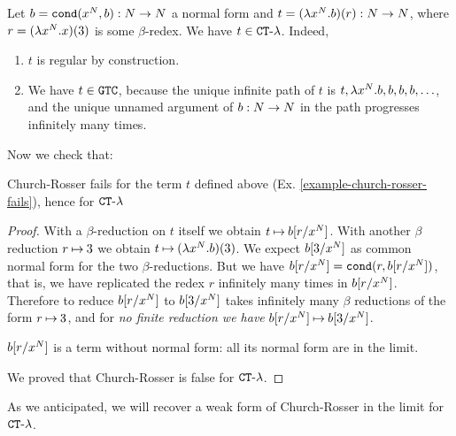 \begin{Eg}
\label{example-church-rosser-fails}
Let $b = {\tt cond}(x^{{N}},b):{N} \rightarrow {N}$ a normal form
and $t = (\lambda x^{{N}}.b)(r):{N} \rightarrow {N}$, 
where $r = (\lambda x^{{N}}.x)(3)$ is some $\beta$-redex. 
We have $t \in { {\tt CT}\mbox{-}\lambda}$. Indeed, 
\begin{enumerate}
\item
$t$ is regular by construction.
\item
We have $t \in {\tt GTC}$, because the unique infinite path of $t$ is 
$t, \lambda x^{{N}}.b, b, b, b, \ldots$, and the
unique unnamed argument of $b:{N} \rightarrow {N}$ in the path progresses infinitely many times.
\end{enumerate}
\end{Eg}

Now we check that:


\begin{lemma}
Church-Rosser fails for the term $t$ defined above (Ex. \ref{example-church-rosser-fails}),
hence for ${ {\tt CT}\mbox{-}\lambda}$
\end{lemma}


\begin{proof}
With a $\beta$-reduction on $t$ itself we obtain $t \mathbin{\mapsto} b[r/x^{N}]$.
With another $\beta$ reduction $r \mathbin{\mapsto} 3$ we obtain $t \mathbin{\mapsto}  (\lambda x^{{N}}.b)(3)$.
We expect $b[3/x^{N}]$ as common normal form for the two $\beta$-reductions. 
But we have $b[r/x^{N}] = {\tt cond}(r,b[r/x^{N}])$,
that is, we have replicated the redex $r$ infinitely many times in $b[r/x^{N}]$. Therefore to reduce 
$b[r/x^{N}]$ to $b[3/x^{N}]$ takes infinitely many $\beta$ reductions of the form $r \mathbin{\mapsto} 3$, 
and for \emph{no finite reduction we have} $b[r/x^{N}] \mathbin{\mapsto} b[3/x^{N}]$. 

$b[r/x^{N}]$ is a term without normal form: all its normal form are in the limit.

We proved that Church-Rosser is false for ${ {\tt CT}\mbox{-}\lambda}$.
\end{proof}

As we anticipated, we will recover a weak form of Church-Rosser in the limit for ${ {\tt CT}\mbox{-}\lambda}$.


